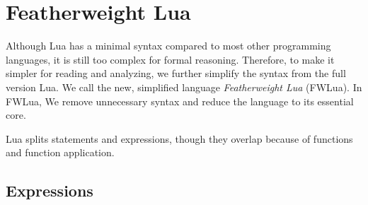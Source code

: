 \chapter{Featherweight Lua}
Although Lua has a minimal syntax compared to most other programming languages, it is still too complex for formal reasoning. Therefore, to make it simpler for reading and analyzing, we further simplify the syntax from the full version Lua. We call the new, simplified language {\it Featherweight Lua} (FWLua). In FWLua, We remove unnecessary syntax and reduce the language to its essential core.


Lua splits statements and expressions, though they overlap because of functions and function application.

\section{Expressions}

